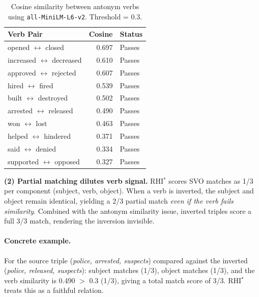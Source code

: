 \documentclass[11pt]{article}
\begin{document}
\begin{table}[h]
\centering
\caption{Cosine similarity between antonym verbs using \texttt{all-MiniLM-L6-v2}. Threshold = 0.3.}
\label{tab:antonym_sim}
\begin{tabular}{lrl}
\toprule
\textbf{Verb Pair} & \textbf{Cosine} & \textbf{Status} \\
\midrule
opened $\leftrightarrow$ closed & 0.697 & Passes \\
increased $\leftrightarrow$ decreased & 0.610 & Passes \\
approved $\leftrightarrow$ rejected & 0.607 & Passes \\
hired $\leftrightarrow$ fired & 0.539 & Passes \\
built $\leftrightarrow$ destroyed & 0.502 & Passes \\
arrested $\leftrightarrow$ released & 0.490 & Passes \\
won $\leftrightarrow$ lost & 0.463 & Passes \\
helped $\leftrightarrow$ hindered & 0.371 & Passes \\
said $\leftrightarrow$ denied & 0.334 & Passes \\
supported $\leftrightarrow$ opposed & 0.327 & Passes \\
\bottomrule
\end{tabular}
\end{table}

\textbf{(2) Partial matching dilutes verb signal.} RHI$^*$ scores SVO matches as 1/3 per component (subject, verb, object). When a verb is inverted, the subject and object remain identical, yielding a 2/3 partial match \emph{even if the verb fails similarity}. Combined with the antonym similarity issue, inverted triples score a full 3/3 match, rendering the inversion invisible.

\paragraph{Concrete example.} For the source triple (\emph{police, arrested, suspects}) compared against the inverted (\emph{police, released, suspects}): subject matches (1/3), object matches (1/3), and the verb similarity is 0.490 $>$ 0.3 (1/3), giving a total match score of 3/3. RHI$^*$ treats this as a faithful relation.
\end{document}
